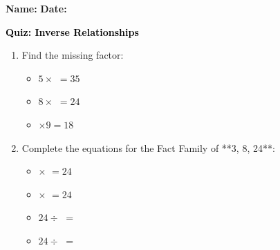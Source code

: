 \documentclass[12pt, letterpaper, fleqn]{article}
\newcommand{\blank}{\underline{\hspace{2.2cm}}}
\begin{document}
\textbf{Name:} \underline{\hspace{5cm}}
\hfill
\textbf{Date:} \underline{\hspace{3cm}}\\

\begin{tcolorbox}[colback=customteal!20]
    \large\textcolor{black}{\textbf{Quiz: Inverse Relationships}}
\end{tcolorbox}

\vspace{5mm}
\begin{enumerate}[itemsep=2.5cm, leftmargin=0.6cm]
\item Find the missing factor:
\begin{itemize}[itemsep=1cm]
  \item $5 \times$ \blank $= 35$
  \item $8 \times$ \blank $= 24$
  \item \blank $\times 9 = 18$
\end{itemize}

\item Complete the equations for the Fact Family of **3, 8, 24**:
\begin{itemize}[itemsep=0.8cm]
  \item \blank $\times$ \blank $= 24$
  \item \blank $\times$ \blank $= 24$
  \item $24 \div$ \blank $=$ \blank
  \item $24 \div$ \blank $=$ \blank
\end{itemize}
\end{enumerate}
\end{document}
